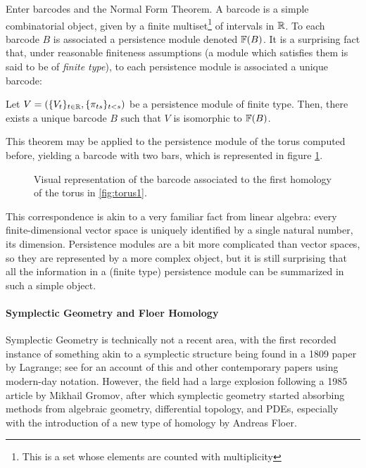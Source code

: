 Enter barcodes and the Normal Form Theorem. A barcode is a simple combinatorial object, given by a finite multiset\footnote{This is a set whose elements are counted with multiplicity} of intervals in $\mathbb{R}$. To each barcode $B$ is associated a persistence module denoted $\mathbb{F}(B)$. It is a surprising fact that, under reasonable finiteness assumptions (a module which satisfies them is said to be of \emph{finite type}), to each persistence module is associated a unique barcode:
\begin{theorem*}
Let $V = (\{V_t\}_{t \in \mathbb{R}}, \{\pi_{ts}\}_{t<s})$ be a persistence module of finite type. Then, there exists a unique barcode $B$ such that $V$ is isomorphic to $\mathbb{F}(B)$.
\end{theorem*}

This theorem may be applied to the persistence module of the torus computed before, yielding a barcode with two bars, which is represented in figure \ref{fig:bctorus}.

\begin{figure}
\centering
{}
\caption{Visual representation of the barcode associated to the first homology of the torus in \ref{fig:torus1}.}\label{fig:bctorus}
\end{figure}

This correspondence is akin to a very familiar fact from linear algebra: every finite-dimensional vector space is uniquely identified by a single natural number, its dimension. Persistence modules are a bit more complicated than vector spaces, so they are represented by a more complex object, but it is still surprising that all the information in a (finite type) persistence module can be summarized in such a simple object.

\paragraph{Symplectic Geometry and Floer Homology}

Symplectic Geometry is technically not a recent area, with the first recorded instance of something akin to a symplectic structure being found in a 1809 paper by Lagrange; see \cite{marle2009inception} for an account of this and other contemporary papers using modern-day notation. However, the field had a large explosion following a 1985 article by Mikhail Gromov, after which symplectic geometry started absorbing methods from algebraic geometry, differential topology, and PDEs, especially with the introduction of a new type of homology by Andreas Floer.

